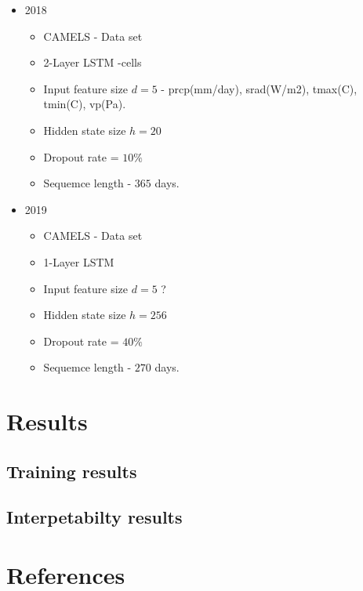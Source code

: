 \documentclass{article}
\begin{document}
\begin{itemize}
	\item 2018
	\begin{itemize}
		\item CAMELS - Data set
		\item 2-Layer LSTM -cells
		\item Input feature size $d=5$ - prcp(mm/day), srad(W/m2), tmax(C), tmin(C), vp(Pa). 
		\item Hidden state  size $h=20$
		\item Dropout rate = $10\%$
		\item Sequemce length - $365$ days. 
	\end{itemize} 
	\item 2019
	\begin{itemize}
		\item CAMELS - Data set
		\item 1-Layer LSTM 
        \item Input feature size $d=5$ ? 
		\item Hidden state  size $h=256$
		\item Dropout rate = $40\%$
		\item Sequemce length - $270$ days. 
	\end{itemize} 	
\end{itemize}

\newpage

\section{Results}

\subsection{Training results}

\subsection{Interpetabilty results}



\newpage
\section{References}
\end{document}
